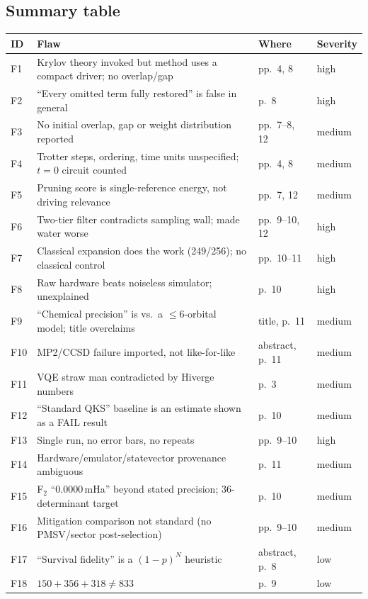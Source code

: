 \documentclass[11pt,a4paper]{article}
\begin{document}
\subsection{Summary table}\label{sec:flawtable}
\begin{center}\small
\begin{tabularx}{\linewidth}{@{}lYL{2.2cm}p{1.4cm}@{}}
\toprule
ID & Flaw & Where & Severity\\\midrule
F1 & Krylov theory invoked but method uses a compact driver; no overlap/gap & pp.~4, 8 & high\\
F2 & ``Every omitted term fully restored'' is false in general & p.~8 & high\\
F3 & No initial overlap, gap or weight distribution reported & pp.~7--8, 12 & medium\\
F4 & Trotter steps, ordering, time units unspecified; $t=0$ circuit counted & pp.~4, 8 & medium\\
F5 & Pruning score is single-reference energy, not driving relevance & pp.~7, 12 & medium\\
F6 & Two-tier filter contradicts sampling wall; made water worse & pp.~9--10, 12 & high\\
F7 & Classical expansion does the work (249/256); no classical control & pp.~10--11 & high\\
F8 & Raw hardware beats noiseless simulator; unexplained & p.~10 & high\\
F9 & ``Chemical precision'' is vs.\ a $\le6$-orbital model; title overclaims & title, p.~11 & medium\\
F10 & MP2/CCSD failure imported, not like-for-like & abstract, p.~11 & medium\\
F11 & VQE straw man contradicted by Hiverge numbers & p.~3 & medium\\
F12 & ``Standard QKS'' baseline is an estimate shown as a FAIL result & p.~10 & medium\\
F13 & Single run, no error bars, no repeats & pp.~9--10 & high\\
F14 & Hardware/emulator/statevector provenance ambiguous & p.~11 & medium\\
F15 & F$_2$ ``0.0000\,mHa'' beyond stated precision; 36-determinant target & p.~10 & medium\\
F16 & Mitigation comparison not standard (no PMSV/sector post-selection) & pp.~9--10 & medium\\
F17 & ``Survival fidelity'' is a $(1-p)^N$ heuristic & abstract, p.~8 & low\\
F18 & $150+356+318\ne833$ & p.~9 & low\\

\end{tabularx}
\end{center}
\end{document}

